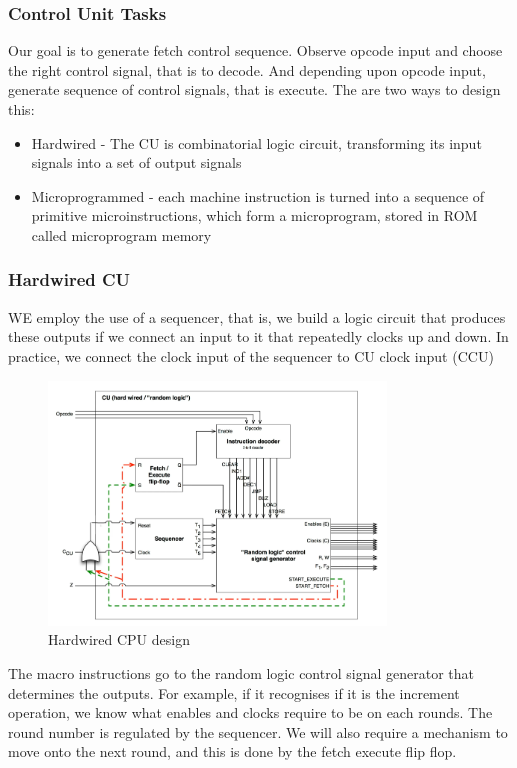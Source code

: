 \documentclass[a4paper]{article}
\theoremstyle{plain}
\theoremstyle{definition}
\theoremstyle{remark}
\begin{document}
\subsubsection{Control Unit Tasks}
Our goal is to generate fetch control sequence. Observe opcode input and choose the right control signal, that is to decode. And depending upon opcode input, generate sequence of control signals, that is execute. The are two ways to design this:
\begin{itemize}
	\item Hardwired - The CU is combinatorial logic circuit, transforming its input signals into a set of output signals
	\item Microprogrammed - each machine instruction is turned into a sequence of primitive microinstructions, which form a microprogram, stored in ROM called microprogram memory
\end{itemize}
\subsubsection{Hardwired CU}
WE employ the use of a sequencer, that is, we build a logic circuit that produces these outputs if we connect an input to it that repeatedly clocks up and down. In practice, we connect the clock input of the sequencer to CU clock input (CCU)
\begin{figure}[H]
	\centering
	\includegraphics[width=0.8\textwidth]{figures/hardwire.png}
	\caption{Hardwired CPU design}
	\label{fig:figures-hardwire-png}
\end{figure}
The macro instructions go to the random logic control signal generator that determines the outputs. For example, if it recognises if it is the increment operation, we know what enables and clocks require to be on each rounds. The round number is regulated by the sequencer. We will also require a mechanism to move onto the next round, and this is done by the fetch execute flip flop.
\end{document}
